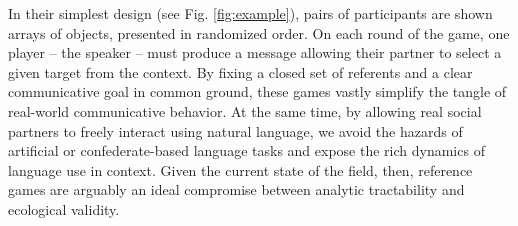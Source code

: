 \documentclass[11pt, floatsintext, jou]{apa6}
\begin{document}
In their simplest design (see Fig. \ref{fig:example}), pairs of participants are shown arrays of objects, presented in randomized order. On each round of the game, one player -- the speaker -- must produce a message allowing their partner to select a given target from the context. By fixing a closed set of referents and a clear communicative goal in common ground, these games vastly simplify the tangle of real-world communicative behavior. At the same time, by allowing real social partners to freely interact using natural language, we avoid the hazards of artificial or confederate-based language tasks \cite{KuhlenBrennan13_LanguageInDialogue} and expose the rich dynamics of language use in context. Given the current state of the field, then, reference games are arguably an ideal compromise between analytic tractability and ecological validity. 
\end{document}
